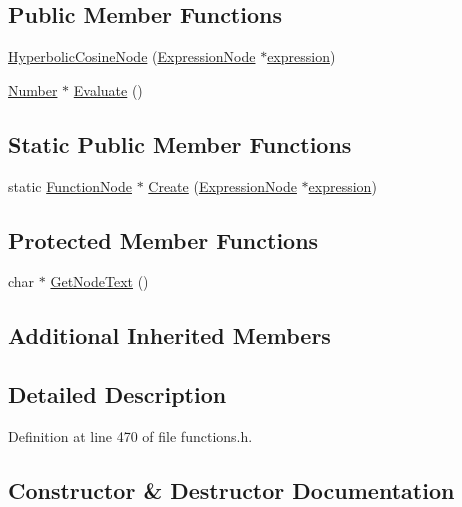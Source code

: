 \subsection*{Public Member Functions}
\begin{DoxyCompactItemize}
\item 
\hyperlink{classHyperbolicCosineNode_a0b67f82a145ad333756d14613919a00c}{Hyperbolic\+Cosine\+Node} (\hyperlink{classExpressionNode}{Expression\+Node} $\ast$\hyperlink{classFunctionNode_ad7577b179a1937aaf8a0058bb5b546dc}{expression})
\item 
\hyperlink{structNumber}{Number} $\ast$ \hyperlink{classHyperbolicCosineNode_a22a3609a695c926aa3dd0b641282bb1f}{Evaluate} ()
\end{DoxyCompactItemize}
\subsection*{Static Public Member Functions}
\begin{DoxyCompactItemize}
\item 
static \hyperlink{classFunctionNode}{Function\+Node} $\ast$ \hyperlink{classHyperbolicCosineNode_ae50b7e2de3943b0eda108e384dbe75a2}{Create} (\hyperlink{classExpressionNode}{Expression\+Node} $\ast$\hyperlink{classFunctionNode_ad7577b179a1937aaf8a0058bb5b546dc}{expression})
\end{DoxyCompactItemize}
\subsection*{Protected Member Functions}
\begin{DoxyCompactItemize}
\item 
char $\ast$ \hyperlink{classHyperbolicCosineNode_ab646fad3a064c9d43aa0edeb36aef4d6}{Get\+Node\+Text} ()
\end{DoxyCompactItemize}
\subsection*{Additional Inherited Members}


\subsection{Detailed Description}


Definition at line 470 of file functions.\+h.



\subsection{Constructor \& Destructor Documentation}
